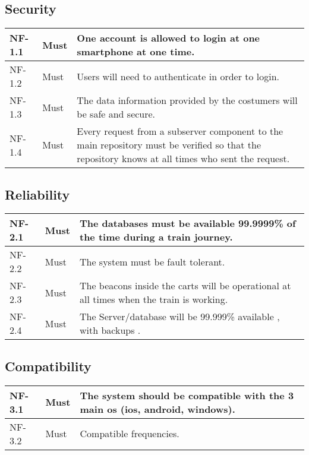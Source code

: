 \subsection{Security}
{
  \renewcommand{\arraystretch}{1.5}
  \begin{table}[H]
    \centering
    \begin{tabularx}{\textwidth}{l|l|X}
      NF-1.1 &Must & One account is allowed to login at one smartphone at one time.\\ \hline
      NF-1.2 &Must & Users will need to authenticate in order to login. \\ \hline
      NF-1.3 &Must & The data information provided by the costumers will be safe and secure. \\ \hline
      NF-1.4 &Must & Every request from a subserver component to the main repository must be verified so that the repository knows at all times who sent the request. \\  
    \end{tabularx}
  \end{table}
}

\subsection{Reliability}
{
  \renewcommand{\arraystretch}{1.5}
  \begin{table}[H]
    \centering
    \begin{tabularx}{\textwidth}{l|l|X}
      NF-2.1 &Must & The databases must be available 99.9999\% of the time during a train journey.\\ \hline
      NF-2.2 &Must & The system must be fault tolerant.  \\ \hline
      NF-2.3 &Must & The beacons inside the carts will be operational at all times when the train is working. \\ \hline
      NF-2.4 &Must & The Server/database will be 99.999\% available , with backups . \\  
    \end{tabularx}
  \end{table}
}

\subsection{Compatibility}
{
  \renewcommand{\arraystretch}{1.5}
  \begin{table}[H]
    \centering
    \begin{tabularx}{\textwidth}{l|l|X}
      NF-3.1 &Must & The system should be compatible with the 3 main os (ios, android, windows). \\ \hline
      NF-3.2 &Must & Compatible frequencies. \\ 
     
    \end{tabularx}
  \end{table}
}


